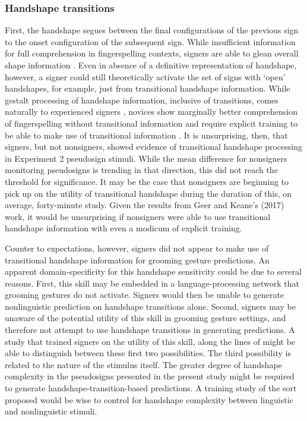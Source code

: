         \subsubsection{Handshape transitions}
            First, the handshape segues between the final configurations of the previous sign to the onset configuration of the subsequent sign. While insufficient information for full comprehension in fingerspelling contexts, signers are able to glean overall shape information \cite{schwarz2000}. Even in absence of a definitive representation of handshape, however, a signer could still theoretically activate the set of signs with ‘open’ handshapes, for example, just from transitional handshape information. While gestalt processing of handshape information, inclusive of transitions, comes naturally to experienced signers \cite{akamastu1985,schwarz2000, wilcox1992}, novices show marginally better comprehension of fingerspelling without transitional information \cite{geer2014} and require explicit training to be able to make use of transitional information \cite{geer2017}. It is unsurprising, then, that signers, but not nonsigners, showed evidence of transitional handshape processing in Experiment 2 pseudosign stimuli. While the mean difference for nonsigners monitoring pseudosigns is trending in that direction, this did not reach the threshold for significance. It may be the case that nonsigners are beginning to pick up on the utility of transitional handshape during the duration of this, on average, forty-minute study. Given the results from Geer and Keane’s (2017) work, it would be unsurprising if nonsigners were able to use transitional handshape information with even a modicum of explicit training. \par
            Counter to expectations, however, signers did not appear to make use of transitional handshape information for grooming gesture predictions. An apparent domain-specificity for this handshape sensitivity could be due to several reasons. First, this skill may be embedded in a language-processing network that grooming gestures do not activate. Signers would then be unable to generate nonlinguistic prediction on handshape transitions alone. Second, signers may be unaware of the potential utility of this skill in grooming gesture settings, and therefore not attempt to use handshape transitions in generating predictions. A study that trained signers on the utility of this skill, along the lines of  might be able to distinguish between these first two possibilities. The third possibility is related to the nature of the stimulus itself. The greater degree of handshape complexity in the pseudosigns presented in the present study might be required to generate handshape-transition-based predictions. A training study of the sort proposed would be wise to control for handshape complexity between linguistic and nonlinguistic stimuli. \par
